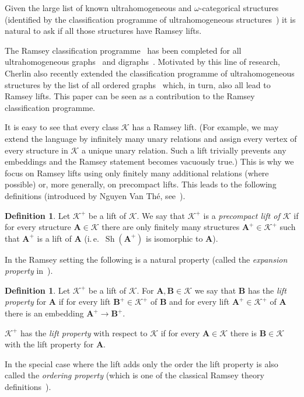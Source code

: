 \documentclass{elsarticle}
\newcommand{\ie}{i.\,e.}
\def\sh{\mathop{\mathrm{Sh}}\nolimits}
\def\str#1{\mathbf {#1}}
\def\K{{\mathcal K}}
\theoremstyle{plain}
\theoremstyle{definition}
\newtheorem{definition}[theorem]{Definition}
\theoremstyle{remark}
\begin{document}
Given the large list of known ultrahomogeneous and $\omega$-categorical structures
(identified by the classification programme of ultrahomogeneous structures~\cite{Lachlan1980,Cherlin1998,Cherlin2013}) it is natural to ask if all those structures have Ramsey lifts.

The Ramsey classification programme~\cite{Nevsetril2005,Hubicka2005a} has been
completed for all ultrahomogeneous graphs~\cite{Nevsetvril1989a} and
digraphs~\cite{Jasinski2013}.  Motivated by this line of research, Cherlin also
recently extended the classification programme of ultrahomogeneous structures by the list of all
ordered graphs~\cite{Cherlin2013} which, in turn, also all lead to Ramsey
lifts.  This paper can be seen as a contribution to the Ramsey classification programme.

It is easy to see that every class $\K$ has a Ramsey lift. (For example, we may extend the
language by infinitely many unary relations and assign every vertex of every
structure in $\K$ a unique unary relation. Such a lift trivially prevents
any embeddings and the Ramsey statement becomes vacuously true.)
This is why we focus on Ramsey lifts using only finitely many additional relations
(where possible) or, more generally, on precompact lifts. This leads to the following definitions (introduced by Nguyen Van Th{\'e}, see~\cite{The2013}).
\begin{definition}
\label{defn:precompact}
Let $\mathcal K^+$ be a lift of $\K$.
We say that $\mathcal K^+$ is a \emph{precompact lift of $\mathcal K$} if for
every structure $\str{A} \in \mathcal K$ there are only finitely many
structures $\str{A}^+ \in \mathcal K^+$ such that $\str{A}^+$ is a lift of
$\str{A}$ (\ie{}\ $\sh(\str{A}^+)$ is isomorphic to $\str{A}$). 
\end{definition}
In the Ramsey setting the following is a natural property (called the \emph{expansion property} in~\cite{The2013}).
\begin{definition}
\label{defn:ordering}
Let $\mathcal K^+$ be a lift of $\K$. For $\str{A},\str{B}\in \K$ we say
that $\str{B}$ has the \emph{lift property} for $\str{A}$ if for every lift
$\str{B}^+\in \mathcal K^+$ of $\str{B}$ and for every lift $\str{A}^+\in \mathcal K^+$ of $\str{A}$ there is an embedding $\str A^+\to\str{B}^+$.

$\mathcal K^+$ has the \emph{lift property} with respect to $\K$ if for every $\str{A}\in \K$
there is $\str{B}\in \K$ with the lift property for $\str{A}$.
\end{definition}
In the special case where the lift adds only the order the lift property is
also called the \emph{ordering property} (which is one of the classical Ramsey theory definitions~\cite{Leeb,Nevsetvril1976}).
\end{document}
